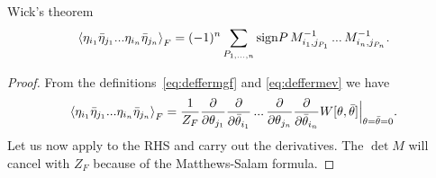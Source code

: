 \begin{theorem}{Wick's theorem}{}
$$
  \ev{\eta_{i_1}\bar{\eta}_{j_1}...\eta_{i_n}\bar{\eta}_{j_n}}_F
  =(-1)^n\sum_{P_{1,...,n}}\sign P\,
   M^{-1}_{i_1,j_{P_1}}\,...\,M^{-1}_{i_n,j_{P_n}}.
$$
\begin{proof} From the definitions~\eqref{eq:deffermgf} and
  \eqref{eq:deffermev} we have
  $$
    \ev{\eta_{i_1}\bar{\eta}_{j_1}...\eta_{i_n}\bar{\eta}_{j_n}}_F
    =\frac{1}{Z_F}
    \pdv{\theta_{j_1}}
    \pdv{\bar{\theta}_{i_1}}\,...\,
    \pdv{\theta_{j_n}}
    \pdv{\bar{\theta}_{i_n}}W[\theta,\bar{\theta}]
    \Big|_{\theta=\bar{\theta}=0}.
  $$
  Let us now apply  to the RHS and carry
  out the derivatives. The $\det M$ will cancel with $Z_F$ because
  of the Matthews-Salam formula. 
\end{proof}
\end{theorem}

